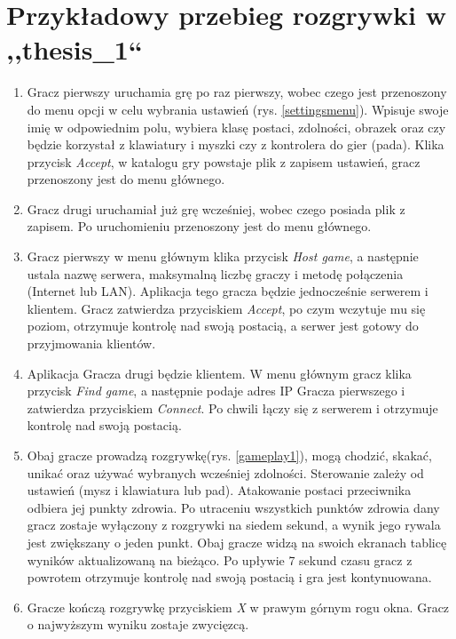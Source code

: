 \documentclass[multip]{SGGW-thesis}
\begin{document}
\chapter{Przykładowy przebieg rozgrywki w ,,thesis\_1``} %

\begin{enumerate}
	\item Gracz pierwszy uruchamia grę po raz pierwszy, wobec czego jest przenoszony do menu opcji w celu wybrania ustawień (rys. \ref{settingsmenu}). Wpisuje swoje imię w odpowiednim polu, wybiera klasę postaci, zdolności, obrazek oraz czy będzie korzystał z klawiatury i myszki czy z kontrolera do gier (pada). Klika przycisk {\em Accept}, w katalogu gry powstaje plik z zapisem ustawień, gracz przenoszony jest do menu głównego.
	\item Gracz drugi uruchamiał już grę wcześniej, wobec czego posiada plik z zapisem. Po uruchomieniu przenoszony jest do menu głównego.
\item Gracz pierwszy w menu głównym klika przycisk {\em Host game}, a następnie ustala nazwę serwera, maksymalną liczbę graczy i metodę połączenia (Internet lub LAN). Aplikacja tego gracza będzie jednocześnie serwerem i klientem. Gracz zatwierdza przyciskiem {\em Accept}, po czym wczytuje mu się poziom, otrzymuje kontrolę nad swoją postacią, a serwer jest gotowy do przyjmowania klientów.
	\item Aplikacja Gracza drugi będzie klientem. W menu głównym gracz klika przycisk {\em Find game}, a następnie podaje adres IP Gracza pierwszego i zatwierdza przyciskiem {\em Connect}. Po chwili łączy się z serwerem i otrzymuje kontrolę nad swoją postacią.
	\item Obaj gracze prowadzą rozgrywkę(rys. \ref{gameplay1}), mogą chodzić, skakać, unikać oraz używać wybranych wcześniej zdolności. Sterowanie zależy od ustawień (mysz i klawiatura lub pad). Atakowanie postaci przeciwnika odbiera jej punkty zdrowia. Po utraceniu wszystkich punktów zdrowia dany gracz zostaje wyłączony z rozgrywki na siedem sekund, a wynik jego rywala jest zwiększany o jeden punkt. Obaj gracze widzą na swoich ekranach tablicę wyników aktualizowaną na bieżąco. Po upływie 7 sekund czasu gracz z powrotem otrzymuje kontrolę nad swoją postacią i gra jest kontynuowana.
	\item Gracze kończą rozgrywkę przyciskiem {\em X} w prawym górnym rogu okna. Gracz o najwyższym wyniku zostaje zwycięzcą.
\end{enumerate}
\end{document}
